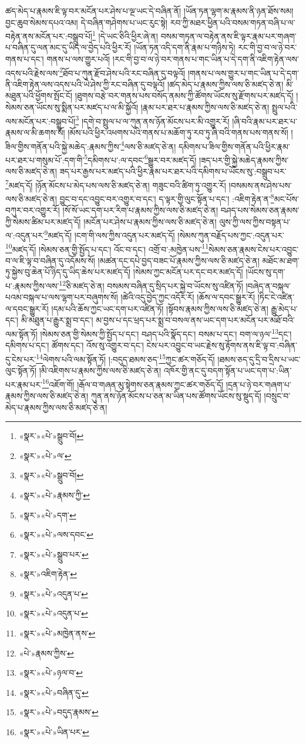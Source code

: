 ཚད་མེད་པ་རྣམས་ཇི་ལྟ་བར་མངོན་པར་ཤེས་པ་ལྔ་ཡང་དེ་བཞིན་ནོ། །ཡོན་ཏན་ལྷག་མ་རྣམས་ནི་ཉན་ཐོས་སམ། བྱང་ཆུབ་སེམས་དཔའ་འམ། དེ་བཞིན་གཤེགས་པ་ཡང་རུང་སྟེ། རབ་ཀྱི་མཐར་ཕྱིན་པའི་བསམ་གཏན་བཞི་པ་ལ་བརྟེན་ནས་མངོན་པར་:བསྒྲུབ་པོ།\footnote{«སྣར་»«པེ་»སྒྲུབ་བོ།} །དེ་ཡང་ཅིའི་ཕྱིར་ཞེ་ན། བསམ་གཏན་ལ་བརྟེན་ནས་ཇི་ལྟར་རྣམ་པར་གཞག་པ་བཞིན་དུ་ལན་མང་དུ་ཡིད་ལ་བྱེད་པའི་ཕྱིར་རོ། །ཡོན་ཏན་འདི་དག་ནི་རྣམ་པ་གཉིས་ཏེ། རང་གི་བྱ་བ་ལ་ཉེ་བར་གནས་པ་དང་། གནས་པ་ལས་གྱུར་པའོ། །རང་གི་བྱ་བ་ལ་ཉེ་བར་གནས་པ་གང་ཡིན་པ་དེ་དག་ནི་འཇིག་རྟེན་ལས་འདས་པའི་རྗེས་ལས་\footnote{«སྣར་»«པེ་»ལ་}ཐོབ་པ་ཀུན་རྫོབ་ཤེས་པའི་རང་བཞིན་དུ་བལྟའོ། །གནས་པ་ལས་གྱུར་པ་གང་ཡིན་པ་དེ་དག་ནི་འཇིག་རྟེན་ལས་འདས་པའི་ཡེ་ཤེས་ཀྱི་རང་བཞིན་དུ་བལྟའོ། །ཚད་མེད་པ་རྣམས་ཀྱིས་ལས་ཅི་མཛད་ཅེ་ན། མི་མཐུན་པའི་ཕྱོགས་སྤོང་ངོ། །ཐུགས་བརྩེ་བར་གནས་པས་བསོད་ནམས་ཀྱི་ཚོགས་ཡོངས་སུ་རྫོགས་པར་མཛད་དོ། །སེམས་ཅན་ཡོངས་སུ་སྨིན་པར་མཛད་པ་ལ་མི་སྐྱོའོ། །རྣམ་པར་ཐར་པ་རྣམས་ཀྱིས་ལས་ཅི་མཛད་ཅེ་ན། སྤྲུལ་པའི་ལས་མངོན་པར་:བསྒྲུབ་པོ།\footnote{«སྣར་»«པེ་»སྒྲུབ་བོ།} །དགེ་བ་སྤྲུལ་པ་ལ་ཀུན་ནས་ཉོན་མོངས་པར་མི་འགྱུར་རོ། །ཞི་བའི་རྣམ་པར་ཐར་པ་རྣམས་ལ་མི་ཆགས་སོ། །མོས་པའི་ཕྱིར་འཕགས་པའི་གནས་པ་མཆོག་ཏུ་རབ་ཏུ་ཞི་བའི་གནས་པས་གནས་སོ། །ཟིལ་གྱིས་གནོན་པའི་སྐྱེ་མཆེད་:རྣམས་ཀྱིས་\footnote{«སྣར་»«པེ་»རྣམས་ཀྱི་}ལས་ཅི་མཛད་ཅེ་ན། དམིགས་པ་ཟིལ་གྱིས་གནོན་པའི་ཕྱིར་རྣམ་པར་ཐར་པ་གསུམ་པོ་:དག་གི་\footnote{«སྣར་»«པེ་»དག་}དམིགས་པ་:ལ་དབང་\footnote{«སྣར་»«པེ་»ལས་དབང་}སྒྱུར་བར་མཛད་དོ། །ཟད་པར་གྱི་སྐྱེ་མཆེད་རྣམས་ཀྱིས་ལས་ཅི་མཛད་ཅེ་ན། ཟད་པར་རྒྱས་པར་མཛད་པའི་ཕྱིར་རྣམ་པར་ཐར་པའི་དམིགས་པ་ཡོངས་སུ་:བསྒྲུབ་པར་\footnote{«སྣར་»«པེ་»སྒྲུབ་པར་}མཛད་དོ། །ཉོན་མོངས་པ་མེད་པས་ལས་ཅི་མཛད་ཅེ་ན། གཟུང་བའི་ཚིག་ཏུ་འགྱུར་རོ། །བསམས་ནས་ཤེས་པས་ལས་ཅི་མཛད་ཅེ་ན། བྱུང་བ་དང་འབྱུང་བར་འགྱུར་བ་དང་། ད་ལྟར་གྱི་ལུང་སྟོན་པ་དང་། :འཇིག་རྟེན་ན་\footnote{«སྣར་»འཇིག་རྟེན་}མང་པོས་བཀུར་བར་འགྱུར་རོ། །སོ་སོ་ཡང་དག་པར་རིག་པ་རྣམས་ཀྱིས་ལས་ཅི་མཛད་ཅེ་ན། བཤད་པས་སེམས་ཅན་རྣམས་ཀྱི་སེམས་ཚིམ་པར་མཛད་དོ། །མངོན་པར་ཤེས་པ་རྣམས་ཀྱིས་ལས་ཅི་མཛད་ཅེ་ན། ལུས་ཀྱི་ལས་ཀྱིས་བསྟན་པ་ལ་:འདུན་པར་\footnote{«སྣར་»«པེ་»འདུན་པ་}མཛད་དོ། །ངག་གི་ལས་ཀྱིས་འདུན་པར་མཛད་དོ། །སེམས་ཀུན་བརྗོད་པས་ཀྱང་:འདུན་པར་\footnote{«སྣར་»«པེ་»འདུན་པ་}མཛད་དོ། །སེམས་ཅན་གྱི་སྤྱོད་པ་དང་། འོང་བ་དང་། འགྲོ་བ་:མཁྱེན་པས་\footnote{«སྣར་»«པེ་»མཁྱེན་ནས་}སེམས་ཅན་རྣམས་ངེས་པར་འབྱུང་བ་ལ་ཇི་ལྟ་བ་བཞིན་དུ་འདོམས་སོ། །མཚན་དང་དཔེ་བྱད་བཟང་པོ་རྣམས་ཀྱིས་ལས་ཅི་མཛད་ཅེ་ན། མཐོང་མ་ཐག་ཏུ་སྐྱེས་བུ་ཆེན་པོ་ཉིད་དུ་ཡིད་ཆེས་པར་མཛད་དོ། །སེམས་ཀྱང་མངོན་པར་དང་བར་མཛད་དོ། །ཡོངས་སུ་དག་པ་:རྣམས་ཀྱིས་ལས་\footnote{«པེ་»རྣམས་ཀྱིས་}ཅི་མཛད་ཅེ་ན། བསམས་བཞིན་དུ་སྲིད་པར་སྐྱེ་བ་ཡོངས་སུ་འཛིན་ཏོ། །བཞེད་ན་བསྐལ་པའམ་བསྐལ་པ་ལས་ལྷག་པར་བཞུགས་སོ། །ཚེའི་འདུ་བྱེད་ཀྱང་འདོར་རོ། །ཆོས་ལ་དབང་སྒྱུར་རོ། །ཏིང་ངེ་འཛིན་ལ་དབང་སྒྱུར་རོ། །དམ་པའི་ཆོས་ཀྱང་ཡང་དག་པར་འཛིན་ཏོ། །སྟོབས་རྣམས་ཀྱིས་ལས་ཅི་མཛད་ཅེ་ན། རྒྱུ་མེད་པ་དང་། མི་མཐུན་པ་རྒྱུར་སྨྲ་བ་དང་། མ་བྱས་པ་དང་ཕྲད་པར་སྨྲ་བ་བསལ་ནས་ཡང་དག་པར་མངོན་པར་མཐོ་བའི་ལམ་སྟོན་ཏོ། །སེམས་ཅན་གྱི་སེམས་ཀྱི་སྤྱོད་པ་དང་། བཤད་པའི་སྣོད་དང་། བསམ་པ་དང་། བག་ལ་ཉལ་\footnote{«སྣར་»«པེ་»ཉལ་བ་}དང་། དམིགས་པ་དང་། ཚོགས་དང་། འོས་སུ་འགྱུར་བ་དང་། ངེས་པར་འབྱུང་བ་ཡང་རྗེས་སུ་རྟོགས་ནས་ཇི་ལྟ་བ་:བཞིན་དུ་ངེས་པར་\footnote{«སྣར་»«པེ་»བཞིན་དུ་}ལེགས་པའི་ལམ་སྟོན་ཏོ། །:བདུད་ཐམས་ཅད་\footnote{«སྣར་»«པེ་»བདུད་རྣམས་}ཀྱང་ཚར་གཅོད་དོ། །ཐམས་ཅད་དུ་དྲི་བ་དྲིས་པ་ཡང་ལུང་སྟོན་ཏོ། །མི་འཇིགས་པ་རྣམས་ཀྱིས་ལས་ཅི་མཛད་ཅེ་ན། འཁོར་གྱི་ནང་དུ་བདག་སྟོན་པ་ཡང་དག་པ་:ཡིན་པར་རྣམ་པར་\footnote{«སྣར་»«པེ་»ཡིན་པར་}འཇོག་གོ། །རྒོལ་བ་གཞན་མུ་སྟེགས་ཅན་རྣམས་ཀྱང་ཚར་གཅོད་དོ། །དྲན་པ་ཉེ་བར་གཞག་པ་རྣམས་ཀྱིས་ལས་ཅི་མཛད་ཅེ་ན། ཀུན་ནས་ཉོན་མོངས་པ་ཅན་མ་ཡིན་པས་ཚོགས་ཡོངས་སུ་སྡུད་དོ། །བསྲུང་བ་མེད་པ་རྣམས་ཀྱིས་ལས་ཅི་མཛད་ཅེ་ན། 